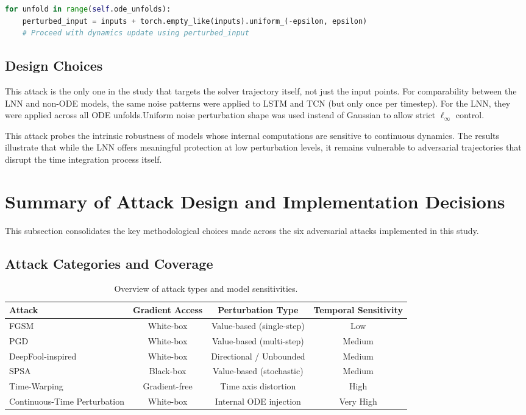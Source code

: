 \begin{lstlisting}[language=Python, caption={Continuous-Time Perturbation Injection}]
for unfold in range(self.ode_unfolds):
    perturbed_input = inputs + torch.empty_like(inputs).uniform_(-epsilon, epsilon)
    # Proceed with dynamics update using perturbed_input
\end{lstlisting}

\subsection*{Design Choices}
This attack is the only one in the study that targets the solver trajectory itself, not just the input points. For comparability between the LNN and non-ODE models, the same noise patterns were applied to LSTM and TCN (but only once per timestep). For the LNN, they were applied across all ODE unfolds.Uniform noise perturbation shape was used instead of Gaussian to allow strict $\ell_\infty$ control.

This attack probes the intrinsic robustness of models whose internal computations are sensitive to continuous dynamics. The results illustrate that while the LNN offers meaningful protection at low perturbation levels, it remains vulnerable to adversarial trajectories that disrupt the time integration process itself.

\section{Summary of Attack Design and Implementation Decisions}

This subsection consolidates the key methodological choices made across the six adversarial attacks implemented in this study.

\subsection*{Attack Categories and Coverage}
\begin{table}[H]
\centering
\begin{tabular}{|l|c|c|c|}
\hline
\textbf{Attack} & \textbf{Gradient Access} & \textbf{Perturbation Type} & \textbf{Temporal Sensitivity} \\
\hline
FGSM & White-box & Value-based (single-step) & Low \\
PGD & White-box & Value-based (multi-step) & Medium \\
DeepFool-inspired & White-box & Directional / Unbounded & Medium \\
SPSA & Black-box & Value-based (stochastic) & Medium \\
Time-Warping & Gradient-free & Time axis distortion & High \\
Continuous-Time Perturbation & White-box & Internal ODE injection & Very High \\
\hline
\end{tabular}
\caption{Overview of attack types and model sensitivities.}
\label{tab:attack_summary}
\end{table}

